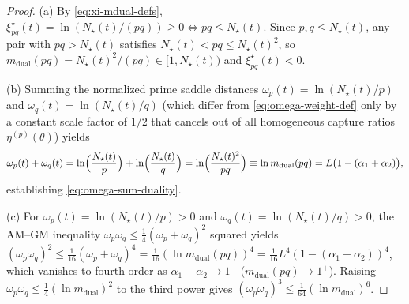 \documentclass[11pt,reqno]{amsart}
\theoremstyle{definition}
\theoremstyle{remark}
\numberwithin{equation}{section}
\newcommand{\dual}{\mathrm{dual}}
\begin{document}
\begin{proof}
(a) By \eqref{eq:xi-mdual-defs}, $\xi_{pq}^\star(t) = \ln(N_\star(t)/(pq)) \ge 0 \iff pq \le N_\star(t)$. Since $p,q \le N_\star(t)$, any pair with $pq > N_\star(t)$ satisfies $N_\star(t) < pq \le N_\star(t)^2$, so $m_{\dual}(pq) = N_\star(t)^2/(pq) \in [1, N_\star(t))$ and $\xi_{pq}^\star(t) < 0$.

(b) Summing the normalized prime saddle distances $\omega_p(t) = \ln(N_\star(t)/p)$ and $\omega_q(t) = \ln(N_\star(t)/q)$ (which differ from \eqref{eq:omega-weight-def} only by a constant scale factor of $1/2$ that cancels out of all homogeneous capture ratios $\eta^{(p)}(\theta)$) yields
\[
\omega_p(t) + \omega_q(t) = \ln\Bigl(\frac{N_\star(t)}{p}\Bigr) + \ln\Bigl(\frac{N_\star(t)}{q}\Bigr) = \ln\Bigl(\frac{N_\star(t)^2}{pq}\Bigr) \equiv \ln m_{\dual}(pq) = L\bigl(1 - (\alpha_1+\alpha_2)\bigr),
\]
establishing \eqref{eq:omega-sum-duality}.

(c) For $\omega_p(t) = \ln(N_\star(t)/p) > 0$ and $\omega_q(t) = \ln(N_\star(t)/q) > 0$, the AM--GM inequality $\omega_p\omega_q \le \frac{1}{4}(\omega_p+\omega_q)^2$ squared yields $(\omega_p\omega_q)^2 \le \frac{1}{16}(\omega_p+\omega_q)^4 = \frac{1}{16}(\ln m_{\dual}(pq))^4 = \frac{1}{16}L^4(1 - (\alpha_1+\alpha_2))^4$, which vanishes to fourth order as $\alpha_1+\alpha_2 \to 1^-$ ($m_{\dual}(pq) \to 1^+$). Raising $\omega_p\omega_q \le \frac{1}{4}(\ln m_{\dual})^2$ to the third power gives $(\omega_p\omega_q)^3 \le \frac{1}{64}(\ln m_{\dual})^6$.
\end{proof}
\end{document}
